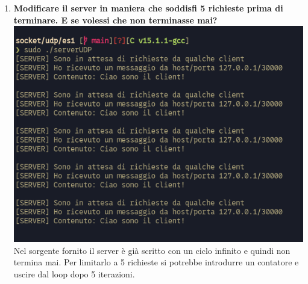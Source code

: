 \documentclass[a4paper,12pt]{article}
\begin{document}
\begin{enumerate}
  \item \textbf{Modificare il server in maniera che soddisfi 5 richieste prima di terminare. E se volessi che non terminasse mai?}\\
    \includegraphics[width=0.7\linewidth]{cinque_client.png}\\
    Nel sorgente fornito il server è già scritto con un ciclo infinito e quindi non termina mai. Per limitarlo a 5 richieste si potrebbe introdurre un contatore e uscire dal loop dopo 5 iterazioni.
\end{enumerate}
\end{document}
